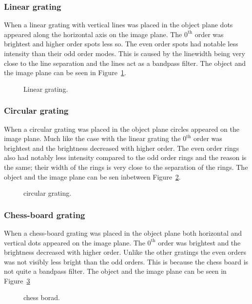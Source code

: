 \documentclass[12pt,a4paper]{article}
\begin{document}
\subsubsection{Linear grating}
When a linear grating with vertical lines was placed in the object plane dots appeared along the horizontal axis on the image plane. The $0^\text{th}$ order was brightest and higher order spots less so. The even order spots had notable less intensity than their odd order modes. This is caused by the linewidth being very close to the line separation and the lines act as a bandpass filter. The object and the image plane can be seen in Figure~\ref{fig:linear_grating}.
\begin{figure}[h]
  \centering
  \noindent\makebox[\textwidth]{\scalebox{0.70}{}}
  \caption{Linear grating.}
  \label{fig:linear_grating}
\end{figure}

\subsubsection{Circular grating}
When a circular grating was placed in the object plane circles appeared on the image plane. Much like the case with the linear grating the $0^\text{th}$ order was brightest and the brightness decreased with higher order. The even order rings also had notably less intensity compared to the odd order rings and the reason is the same; their width of the rings is very close to the separation of the rings. The object and the image plane can be sen inbetween Figure~\ref{fig:circular_grating}.
\begin{figure}[h]
  \centering
  \noindent\makebox[\textwidth]{\scalebox{0.70}{}}
  \caption{circular grating.}
  \label{fig:circular_grating}
\end{figure}

\subsubsection{Chess-board grating}
When a chess-board grating was placed in the object plane both horizontal and vertical dots appeared on the image plane. The $0^\text{th}$ order was brightest and the brightness decreased with higher order. Unlike the other gratings the even orders was not visibly less bright than the odd orders. This is because the chess board is not quite a bandpass filter. The object and the image plane can be seen in Figure~\ref{fig:chess_board}
\begin{figure}[h]
  \centering
  \noindent\makebox[\textwidth]{\scalebox{0.70}{}}
  \caption{chess borad.}
  \label{fig:chess_board}
\end{figure}
\end{document}
